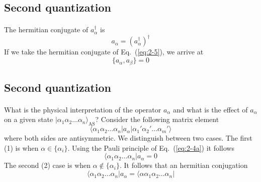 \documentclass[%
twoside,                 %
final,                   %
10pt]{article}
\begin{document}
\subsection{Second quantization}

\paragraph{}
The hermitian conjugate  of $a_\alpha^{\dagger}$ is
\begin{equation}
	a_{\alpha} = ( a_{\alpha}^{\dagger} )^{\dagger} \label{eq:2-6}
\end{equation}
If we take the hermitian conjugate of Eq.~(\ref{eq:2-5}), we arrive at 
\begin{equation}
	\{a_{\alpha},a_{\beta}\} = 0 \label{eq:2-7}
\end{equation}




\subsection{Second quantization}

\paragraph{}
What is the physical interpretation of the operator $a_\alpha$ and what is the effect of 
$a_\alpha$ on a given state $|\alpha_1\alpha_2\dots\alpha_n\rangle_{\mathrm{AS}}$? 
Consider the following matrix element
\begin{equation}
	\langle\alpha_1\alpha_2 \dots \alpha_n|a_\alpha|\alpha_1'\alpha_2' \dots \alpha_m'\rangle \label{eq:2-8}
\end{equation}
where both sides are antisymmetric. We  distinguish between two cases. The first (1) is when
$\alpha \in \{\alpha_i\}$. Using the Pauli principle of Eq.~(\ref{eq:2-4a}) it follows
\begin{equation}
		\langle\alpha_1\alpha_2 \dots \alpha_n|a_\alpha = 0 \label{eq:2-9a}
\end{equation}
The second (2) case is when $\alpha \notin \{\alpha_i\}$. It follows that an hermitian conjugation
\begin{equation}
		\langle \alpha_1\alpha_2 \dots \alpha_n|a_\alpha = \langle\alpha\alpha_1\alpha_2 \dots \alpha_n|  \label{eq:2-9b}
\end{equation}
\end{document}
